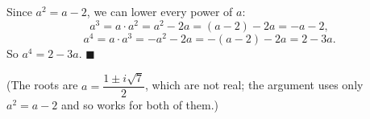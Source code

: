Since $a^2=a-2$, we can lower every power of $a$:
\[
a^3=a\cdot a^2=a^2-2a=(a-2)-2a=-a-2,
\]
\[
a^4=a\cdot a^3=-a^2-2a=-(a-2)-2a=2-3a .
\]
So $a^4=2-3a$. $\blacksquare$

(The roots are $a=\dfrac{1\pm i\sqrt7}{2}$, which are not real; the argument uses only $a^2=a-2$ and so works for both of them.)
